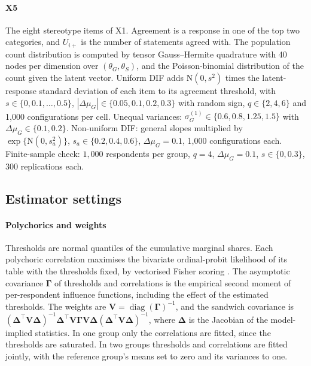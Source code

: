 \paragraph{X5}
The eight stereotype items of X1. Agreement is a response in one of the top two categories, and $U_{i+}$ is the number of statements agreed with. The population count distribution is computed by tensor Gauss--Hermite quadrature with 40 nodes per dimension over $(\theta_G,\theta_S)$, and the Poisson-binomial distribution of the count given the latent vector. Uniform DIF adds $\mathrm N(0,s^2)$ times the latent-response standard deviation of each item to its agreement threshold, with $s\in\{0,0.1,\dots,0.5\}$, $|\Delta\mu_G|\in\{0.05,0.1,0.2,0.3\}$ with random sign, $q\in\{2,4,6\}$ and 1{,}000 configurations per cell. Unequal variances: $\sigma_G^{(1)}\in\{0.6,0.8,1.25,1.5\}$ with $\Delta\mu_G\in\{0.1,0.2\}$. Non-uniform DIF: general slopes multiplied by $\exp\{\mathrm N(0,s_a^2)\}$, $s_a\in\{0.2,0.4,0.6\}$, $\Delta\mu_G=0.1$, 1{,}000 configurations each. Finite-sample check: $1{,}000$ respondents per group, $q=4$, $\Delta\mu_G=0.1$, $s\in\{0,0.3\}$, 300 replications each.

\subsection{Estimator settings}\label{app:sim-est}

\paragraph{Polychorics and weights}
Thresholds are normal quantiles of the cumulative marginal shares. Each polychoric correlation maximises the bivariate ordinal-probit likelihood of its table with the thresholds fixed, by vectorised Fisher scoring \citep{olsson1979}. The asymptotic covariance $\bm\Gamma$ of thresholds and correlations is the empirical second moment of per-respondent influence functions, including the effect of the estimated thresholds. The weights are $\bm V=\operatorname{diag}(\bm\Gamma)^{-1}$, and the sandwich covariance is $(\bm\Delta^\top\bm V\bm\Delta)^{-1}\bm\Delta^\top\bm V\bm\Gamma\bm V\bm\Delta(\bm\Delta^\top\bm V\bm\Delta)^{-1}$, where $\bm\Delta$ is the Jacobian of the model-implied statistics. In one group only the correlations are fitted, since the thresholds are saturated. In two groups thresholds and correlations are fitted jointly, with the reference group's means set to zero and its variances to one.

